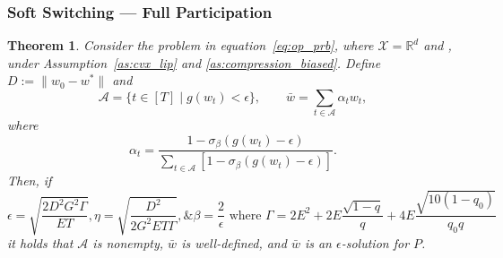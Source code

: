 \documentclass{article} %
\newtheorem{theorem}{Theorem}[]
\def\eqref#1{equation~\ref{#1}}
\def\R{{\mathbb{R}}}
\def\A{{\mathcal A}}
\begin{document}
\subsubsection{Soft Switching --- Full Participation}
\begin{theorem}
\label{thm:fedssgbicm}
Consider the problem in \eqref{eq:op_prb}, where $\mathcal{X} = \R^d$ and , under Assumption~\ref{as:cvx_lip} and \ref{as:compression_biased}. Define $D:=\|w_0-w^*\|$ and
\begin{equation*}
\A = \{t\in [T]\;| \;g(w_{t})< \epsilon\}, \qquad \bar{w} = \sum_{t\in \A} \alpha_t w_t,
 \end{equation*}
 where 
    \begin{equation}
        \alpha_t = \frac{1-\sigma_\beta(g(w_t)-\epsilon)}{\sum_{t\in \A} [1-\sigma_\beta(g(w_t)-\epsilon)]}.
    \end{equation}
Then, if
\begin{equation*}
\epsilon = \sqrt{\frac{{2 D^2 G^2 \Gamma}}{{E T}}}, \eta = \sqrt{\frac{D^2}{2G^2 E T \Gamma}}, \& \beta = \frac{2}{\epsilon}\text{ where } \Gamma = 2 E^2 + 2E\frac{\sqrt{1-q}}{q} + 4E\frac{\sqrt{10(1-q_0)}}{q_0q}
 \end{equation*}
it holds that $\A$ is nonempty, $\bar{w}$ is well-defined, and $\bar{w}$ is an $\epsilon$-solution for $P$.
\end{theorem}
\end{document}
